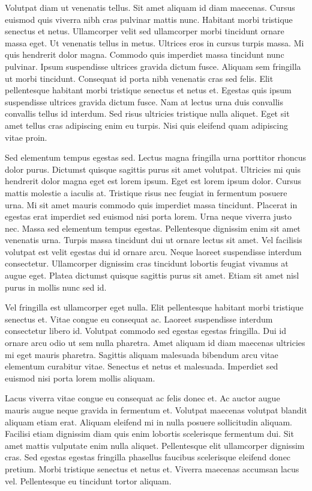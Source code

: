 \documentclass[11pt,a4paper]{article}
\begin{document}
Volutpat diam ut venenatis tellus. Sit amet aliquam id diam maecenas. Cursus euismod quis viverra nibh cras pulvinar mattis nunc. Habitant morbi tristique senectus et netus. Ullamcorper velit sed ullamcorper morbi tincidunt ornare massa eget. Ut venenatis tellus in metus. Ultrices eros in cursus turpis massa. Mi quis hendrerit dolor magna. Commodo quis imperdiet massa tincidunt nunc pulvinar. Ipsum suspendisse ultrices gravida dictum fusce. Aliquam sem fringilla ut morbi tincidunt. Consequat id porta nibh venenatis cras sed felis. Elit pellentesque habitant morbi tristique senectus et netus et. Egestas quis ipsum suspendisse ultrices gravida dictum fusce. Nam at lectus urna duis convallis convallis tellus id interdum. Sed risus ultricies tristique nulla aliquet. Eget sit amet tellus cras adipiscing enim eu turpis. Nisi quis eleifend quam adipiscing vitae proin.

Sed elementum tempus egestas sed. Lectus magna fringilla urna porttitor rhoncus dolor purus. Dictumst quisque sagittis purus sit amet volutpat. Ultricies mi quis hendrerit dolor magna eget est lorem ipsum. Eget est lorem ipsum dolor. Cursus mattis molestie a iaculis at. Tristique risus nec feugiat in fermentum posuere urna. Mi sit amet mauris commodo quis imperdiet massa tincidunt. Placerat in egestas erat imperdiet sed euismod nisi porta lorem. Urna neque viverra justo nec. Massa sed elementum tempus egestas. Pellentesque dignissim enim sit amet venenatis urna. Turpis massa tincidunt dui ut ornare lectus sit amet. Vel facilisis volutpat est velit egestas dui id ornare arcu. Neque laoreet suspendisse interdum consectetur. Ullamcorper dignissim cras tincidunt lobortis feugiat vivamus at augue eget. Platea dictumst quisque sagittis purus sit amet. Etiam sit amet nisl purus in mollis nunc sed id.

Vel fringilla est ullamcorper eget nulla. Elit pellentesque habitant morbi tristique senectus et. Vitae congue eu consequat ac. Laoreet suspendisse interdum consectetur libero id. Volutpat commodo sed egestas egestas fringilla. Dui id ornare arcu odio ut sem nulla pharetra. Amet aliquam id diam maecenas ultricies mi eget mauris pharetra. Sagittis aliquam malesuada bibendum arcu vitae elementum curabitur vitae. Senectus et netus et malesuada. Imperdiet sed euismod nisi porta lorem mollis aliquam.

Lacus viverra vitae congue eu consequat ac felis donec et. Ac auctor augue mauris augue neque gravida in fermentum et. Volutpat maecenas volutpat blandit aliquam etiam erat. Aliquam eleifend mi in nulla posuere sollicitudin aliquam. Facilisi etiam dignissim diam quis enim lobortis scelerisque fermentum dui. Sit amet mattis vulputate enim nulla aliquet. Pellentesque elit ullamcorper dignissim cras. Sed egestas egestas fringilla phasellus faucibus scelerisque eleifend donec pretium. Morbi tristique senectus et netus et. Viverra maecenas accumsan lacus vel. Pellentesque eu tincidunt tortor aliquam.
\end{document}
